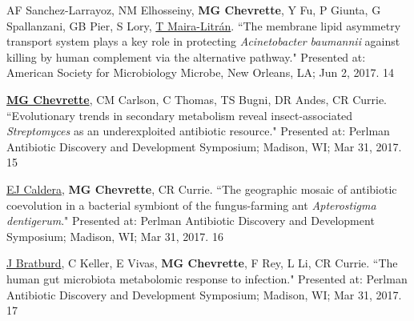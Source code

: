 \begin{cvpubs}
\cvpub
{AF Sanchez-Larrayoz, NM Elhosseiny, \textbf{MG Chevrette}, Y Fu, P Giunta, G Spallanzani, GB Pier, S Lory, \underline{T Maira-Litr\'{a}n}. ``The membrane lipid asymmetry transport system plays a key role in protecting \textit{Acinetobacter baumannii} against killing by human complement via the alternative pathway." Presented at: American Society for Microbiology Microbe, New Orleans, LA; Jun 2, 2017.}
{14}

\cvpub
{\underline{\textbf{MG Chevrette}}, CM Carlson, C Thomas, TS Bugni, DR Andes, CR Currie. ``Evolutionary trends in secondary metabolism reveal insect-associated \textit{Streptomyces} as an underexploited antibiotic resource." Presented at: Perlman Antibiotic Discovery and Development Symposium; Madison, WI; Mar 31, 2017.}
{15}

\cvpub
{\underline{EJ Caldera}, \textbf{MG Chevrette}, CR Currie. ``The geographic mosaic of antibiotic coevolution in a bacterial symbiont of the fungus-farming ant \textit{Apterostigma dentigerum}." Presented at: Perlman Antibiotic Discovery and Development Symposium; Madison, WI; Mar 31, 2017.}
{16}

\cvpub
{\underline{J Bratburd}, C Keller, E Vivas, \textbf{MG Chevrette}, F Rey, L Li, CR Currie. ``The human gut microbiota metabolomic response to infection." Presented at: Perlman Antibiotic Discovery and Development Symposium; Madison, WI; Mar 31, 2017.}
{17}


\end{cvpubs}
